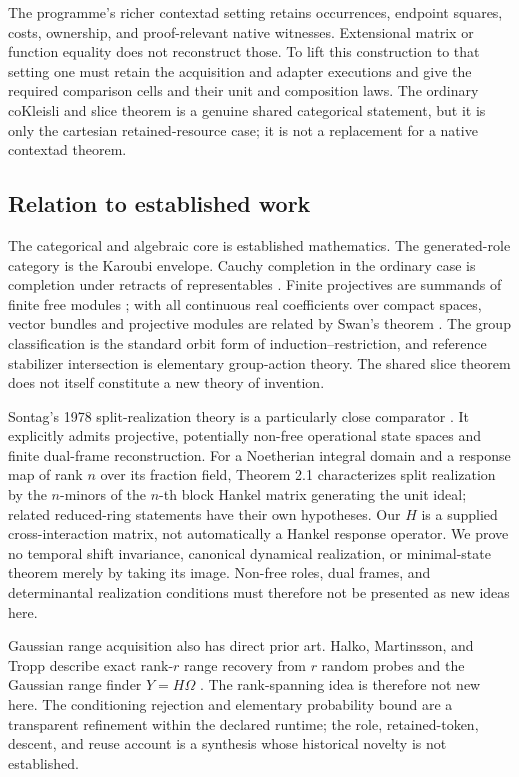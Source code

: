 \documentclass[11pt]{article}
\theoremstyle{definition}
\theoremstyle{remark}
\begin{document}
The programme's richer contextad setting retains occurrences, endpoint squares, costs, ownership, and proof-relevant native witnesses. Extensional matrix or function equality does not reconstruct those. To lift this construction to that setting one must retain the acquisition and adapter executions and give the required comparison cells and their unit and composition laws. The ordinary coKleisli and slice theorem is a genuine shared categorical statement, but it is only the cartesian retained-resource case; it is not a replacement for a native contextad theorem.

\subsection{Relation to established work}
The categorical and algebraic core is established mathematics. The generated-role category is the Karoubi envelope. Cauchy completion in the ordinary case is completion under retracts of representables \cite[Section 5.8]{Kelly1982}. Finite projectives are summands of finite free modules \cite{Stacks}; with all continuous real coefficients over compact spaces, vector bundles and projective modules are related by Swan's theorem \cite{Swan}. The group classification is the standard orbit form of induction--restriction, and reference stabilizer intersection is elementary group-action theory. The shared slice theorem does not itself constitute a new theory of invention.

Sontag's 1978 split-realization theory is a particularly close comparator \cite{SontagSplit}. It explicitly admits projective, potentially non-free operational state spaces and finite dual-frame reconstruction. For a Noetherian integral domain and a response map of rank $n$ over its fraction field, Theorem 2.1 characterizes split realization by the $n$-minors of the $n$-th block Hankel matrix generating the unit ideal; related reduced-ring statements have their own hypotheses. Our $H$ is a supplied cross-interaction matrix, not automatically a Hankel response operator. We prove no temporal shift invariance, canonical dynamical realization, or minimal-state theorem merely by taking its image. Non-free roles, dual frames, and determinantal realization conditions must therefore not be presented as new ideas here.

Gaussian range acquisition also has direct prior art. Halko, Martinsson, and Tropp describe exact rank-$r$ range recovery from $r$ random probes and the Gaussian range finder $Y=H\Omega$ \cite[Sections 1.3.2 and 4.2, Algorithm 4.1]{HMT2011}. The rank-spanning idea is therefore not new here. The conditioning rejection and elementary probability bound are a transparent refinement within the declared runtime; the role, retained-token, descent, and reuse account is a synthesis whose historical novelty is not established.
\end{document}
